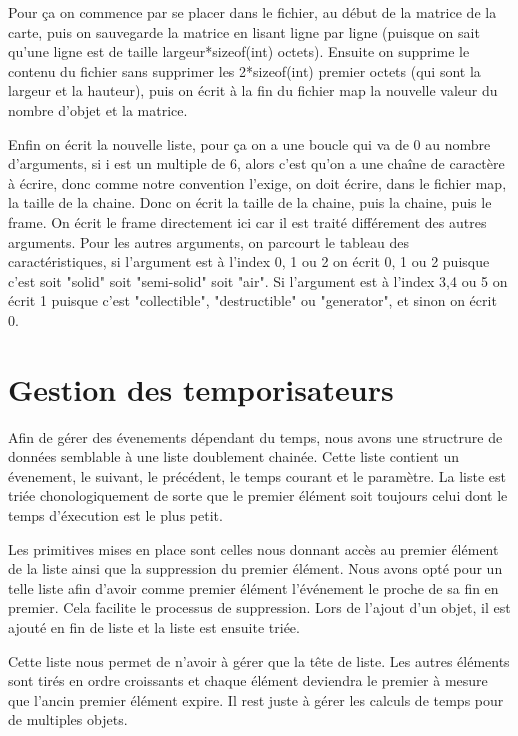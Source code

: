 \documentclass[10pt,a4paper]{article}
\begin{document}
            Pour ça on commence par se placer dans le fichier, au début de la matrice de la carte, puis on sauvegarde la matrice en lisant ligne par ligne (puisque on sait qu'une ligne est de taille largeur*sizeof(int) octets).
            Ensuite on supprime le contenu du fichier sans supprimer les 2*sizeof(int) premier octets (qui sont la largeur et la hauteur), puis on écrit à la fin du fichier map la nouvelle valeur du nombre d'objet et la matrice.
            
            Enfin on écrit la nouvelle liste, pour ça on a une boucle qui va de 0 au nombre d'arguments, si i est un multiple de 6, alors c'est qu'on a une chaîne de caractère à écrire, donc comme notre convention l'exige, on doit écrire, dans le fichier map, la taille de la chaine. Donc on écrit la taille de la chaine, puis la chaine, puis le frame. On écrit le frame directement ici car il est traité différement des autres arguments.
            Pour les autres arguments, on parcourt le tableau des caractéristiques, si l'argument est à l'index 0, 1 ou 2  on écrit 0, 1 ou 2 puisque c'est soit "solid" soit "semi-solid" soit "air". Si l'argument est à l'index 3,4 ou 5 on écrit 1 puisque c'est "collectible", "destructible" ou "generator", et sinon on écrit 0. 
            
        
    
 
\section{Gestion des temporisateurs}

	Afin de gérer des évenements dépendant du temps, nous avons une structrure de données semblable à une liste doublement chainée. Cette liste contient un évenement, le suivant, le précédent, le temps courant et le paramètre. La liste est triée chonologiquement de sorte que le premier élément soit toujours celui dont le temps d'éxecution est le plus petit. 
	
	Les primitives mises en place sont celles nous donnant accès au premier élément de la liste ainsi que la suppression du premier élément. Nous avons opté pour un telle liste afin d'avoir comme premier élément l'événement le proche de sa fin en premier. Cela facilite le processus de suppression. Lors de l'ajout d'un objet, il est ajouté en fin de liste et la liste est ensuite triée.
	
	Cette liste nous permet de n'avoir à gérer que la tête de liste. Les autres éléments sont tirés en ordre croissants et chaque élément deviendra le premier à mesure que l'ancin premier élément expire. Il rest juste à gérer les calculs de temps pour de multiples objets.
\end{document}
